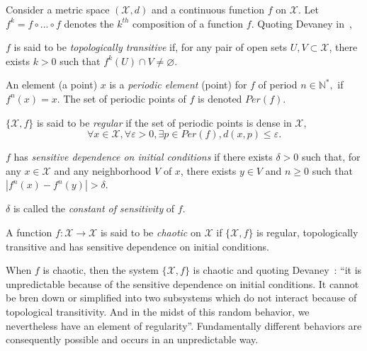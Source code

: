 \documentclass{llncs}
\begin{document}
Consider a metric space $(\mathcal{X},d)$ and a continuous function $f$ on $\mathcal{X}$. Let $f^{k}=f\circ ...\circ f$ denotes the $k^{th}$ composition of a function $f$. Quoting Devaney in~\cite{Devaney},

\begin{definition}
$f$ is said to be \emph{topologically transitive} if, for any pair of open sets $U,V \subset \mathcal{X}$, there exists $k>0$ such that $f^k(U) \cap V \neq \varnothing$.
\end{definition}

\begin{definition}
An element (a point) $x$ is a \emph{periodic element} (point) for $f$ of period $n\in \mathds{N}^*,$ if $f^{n}(x)=x$. The set of periodic points of $f$ is denoted $Per(f).$
\end{definition}

\begin{definition}
$\{\mathcal{X},f\}$ is said to be \emph{regular} if the set of periodic points is dense in $\mathcal{X}$,
\begin{equation*}
\forall x\in \mathcal{X},\forall \varepsilon >0,\exists p\in Per(f),d(x,p)\leqslant \varepsilon .
\end{equation*}
\end{definition}

\begin{definition}
\label{sensitivity} $f$ has \emph{sensitive dependence on initial conditions}
if there exists $\delta >0$ such that, for any $x\in \mathcal{X}$ and any neighborhood $V$ of $x$, there exists $y\in V$ and $n\geqslant 0$ such that $|f^{n}(x)-f^{n}(y)|>\delta $.

$\delta$ is called the \emph{constant of sensitivity} of $f$.
\end{definition}


\begin{definition}
A function $f:\mathcal{X}\longrightarrow \mathcal{X}$ is said to be \emph{chaotic} on $\mathcal{X}$ if $\{\mathcal{X},f\}$ is regular, topologically transitive and has sensitive dependence on initial conditions.
\end{definition}

When $f$ is chaotic, then the system $\{\mathcal{X}, f\}$ is chaotic and quoting Devaney~\cite{Devaney}: ``it is unpredictable because of the sensitive dependence on initial conditions. It cannot be bren down or simplified into two subsystems which do not interact because of topological transitivity. And in the midst of this random behavior, we nevertheless have an element of regularity''. Fundamentally different behaviors are consequently possible and occurs in an unpredictable way.
\end{document}
